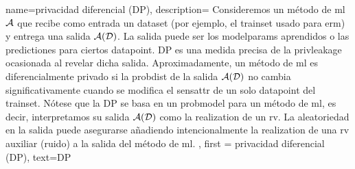 	 {name=privacidad diferencial (DP),
	  description={
		  Consideremos un método de \gls{ml} $\mathcal{A}$ que recibe como entrada un \gls{dataset} (por ejemplo, el \gls{trainset} 
		  usado para \gls{erm}) y entrega una salida $\mathcal{A}(\mathcal{D})$. La salida 
		  puede ser los \gls{modelparams} aprendidos o las \gls{prediction}es para ciertos \gls{datapoint}. 
		  DP es una medida precisa de la \gls{privleakage} ocasionada al revelar dicha salida.
		 Aproximadamente, un método de \gls{ml} es diferencialmente privado si la \gls{probdist} 
		  de la salida $\mathcal{A}(\mathcal{D})$ no cambia significativamente cuando se modifica el \gls{sensattr} 
		  de un solo \gls{datapoint} del \gls{trainset}. Nótese que la DP 
		  se basa en un \gls{probmodel} para un método de \gls{ml}, es decir, interpretamos su salida $\mathcal{A}(\mathcal{D})$ 
		  como la \gls{realization} de un \gls{rv}. La aleatoriedad en la salida puede asegurarse añadiendo intencionalmente la
		  \gls{realization} de una \gls{rv} auxiliar (ruido) a la salida del método de  \gls{ml}.
		 }, 
		 first = {privacidad diferencial (DP)}, text={DP} 
	 }
